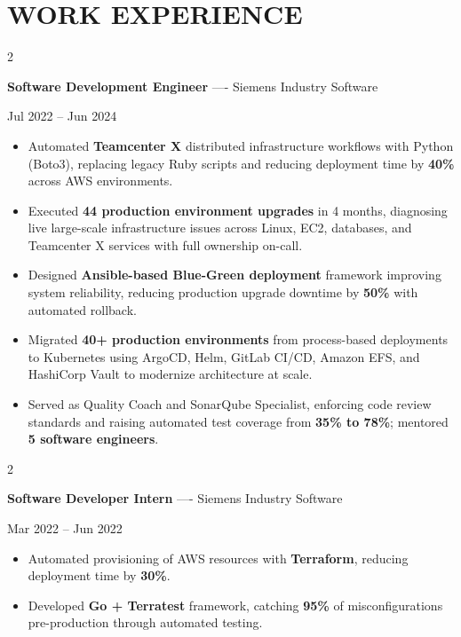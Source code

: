 \documentclass[10pt, letterpaper]{article}
\newenvironment{highlights}{
    \begin{itemize}[
        topsep=0.10 cm,
        parsep=0.06 cm,
        partopsep=0pt,
        itemsep=0.06 cm,
        leftmargin=12pt
    ]
}{
    \end{itemize}
}
\newenvironment{twocolentry}[2][]{
    \onecolentry
    \def\secondColumn{#2}
    \setcolumnwidth{\fill, 4.5 cm}
    \begin{paracol}{2}
}{
    \switchcolumn \raggedleft \secondColumn
    \end{paracol}
    \endonecolentry
}
\begin{document}
\section{WORK EXPERIENCE}
\begin{twocolentry}{Jul 2022 -- Jun 2024}
\textbf{Software Development Engineer} ---- Siemens Industry Software
\end{twocolentry}
\begin{highlights}
  \item Automated \textbf{Teamcenter X} distributed infrastructure workflows with Python (Boto3), replacing legacy Ruby scripts and reducing deployment time by \textbf{40\%} across AWS environments.
  \item Executed \textbf{44 production environment upgrades} in 4 months, diagnosing live large-scale infrastructure issues across Linux, EC2, databases, and Teamcenter X services with full ownership on-call.
  \item Designed \textbf{Ansible-based Blue-Green deployment} framework improving system reliability, reducing production upgrade downtime by \textbf{50\%} with automated rollback.
  \item Migrated \textbf{40+ production environments} from process-based deployments to Kubernetes using ArgoCD, Helm, GitLab CI/CD, Amazon EFS, and HashiCorp Vault to modernize architecture at scale.
  \item Served as Quality Coach and SonarQube Specialist, enforcing code review standards and raising automated test coverage from \textbf{35\% to 78\%}; mentored \textbf{5 software engineers}.
\end{highlights}

\vspace{0.15 cm}

\begin{twocolentry}{Mar 2022 -- Jun 2022}
\textbf{Software Developer Intern} ---- Siemens Industry Software
\end{twocolentry}
\begin{highlights}
  \item Automated provisioning of AWS resources with \textbf{Terraform}, reducing deployment time by \textbf{30\%}.
  \item Developed \textbf{Go + Terratest} framework, catching \textbf{95\%} of misconfigurations pre-production through automated testing.
\end{highlights}

\vspace{0.15 cm}
\end{document}
